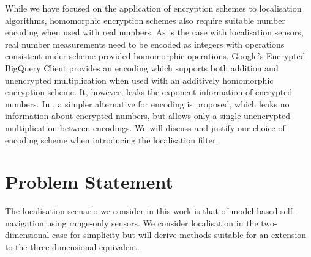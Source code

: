 \documentclass[10pt,journal,compsoc]{IEEEtran}
\theoremstyle{definition}
\theoremstyle{definition}
\theoremstyle{remark}
\begin{document}
While we have focused on the application of encryption schemes to localisation algorithms, homomorphic encryption schemes also require suitable number encoding when used with real numbers. As is the case with localisation sensors, real number measurements need to be encoded as integers with operations consistent under scheme-provided homomorphic operations. Google's Encrypted BigQuery Client \cite{Encryptedbigqueryclient2015} provides an encoding which supports both addition and unencrypted multiplication when used with an additively homomorphic encryption scheme. It, however, leaks the exponent information of encrypted numbers. In \cite{farokhiSecurePrivateControl2017}, a simpler alternative for encoding is proposed, which leaks no information about encrypted numbers, but allows only a single unencrypted multiplication between encodings. We will discuss and justify our choice of encoding scheme when introducing the localisation filter.

% 
%                                                                                
%                                                                                
%                                                                                
% 

\section{Problem Statement} \label{sec:problem_statement}
The localisation scenario we consider in this work is that of model-based self-navigation using range-only sensors. We consider localisation in the two-dimensional case for simplicity but will derive methods suitable for an extension to the three-dimensional equivalent.
\end{document}
